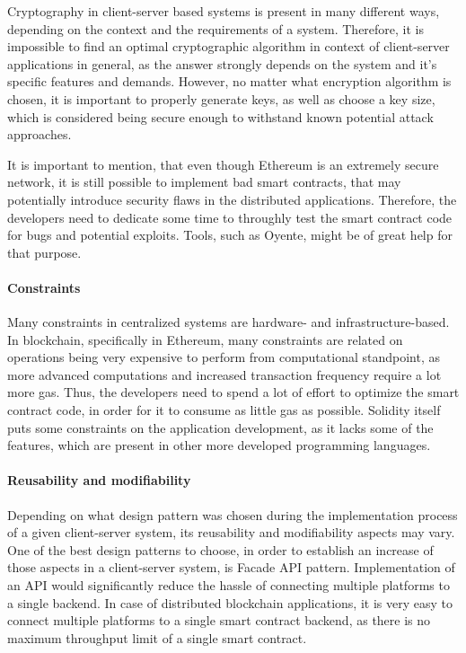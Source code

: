 Cryptography in client-server based systems is present in many different ways, depending on the context and the requirements of a system. Therefore, it is impossible to find an optimal cryptographic algorithm in context of client-server applications in general, as the answer strongly depends on the system and it's specific features and demands. However, no matter what encryption algorithm is chosen, it is important to properly generate keys, as well as choose a key size, which is considered being secure enough to withstand known potential attack approaches.

It is important to mention, that even though Ethereum is an extremely secure network, it is still possible to implement bad smart contracts, that may potentially introduce security flaws in the distributed applications. Therefore, the developers need to dedicate some time to throughly test the smart contract code for bugs and potential exploits. Tools, such as Oyente, might be of great help for that purpose.

\paragraph{Constraints}
Many constraints in centralized systems are hardware- and infrastructure-based. In blockchain, specifically in Ethereum, many constraints are related on operations being very expensive to perform from computational standpoint, as more advanced computations and increased transaction frequency require a lot more gas. Thus, the developers need to spend a lot of effort to optimize the smart contract code, in order for it to consume as little gas as possible. Solidity itself puts some constraints on the application development, as it lacks some of the features, which are present in other more developed programming languages.

\paragraph{Reusability and modifiability}
Depending on what design pattern was chosen during the implementation process of a given client-server system, its reusability and modifiability aspects may vary. One of the best design patterns to choose, in order to establish an increase of those aspects in a client-server system, is Facade API pattern. Implementation of an API would significantly reduce the hassle of connecting multiple platforms to a single backend. In case of distributed blockchain applications, it is very easy to connect multiple platforms to a single smart contract backend, as there is no maximum throughput limit of a single smart contract.

